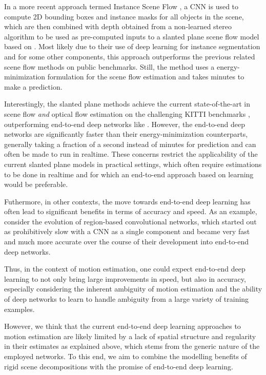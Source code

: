 In a more recent approach termed Instance Scene Flow \cite{InstanceSceneFlow},
a CNN is used to compute 2D bounding boxes and instance masks for all objects in the scene, which are then combined
with depth obtained from a non-learned stereo algorithm to be used as pre-computed
inputs to a slanted plane scene flow model based on \cite{KITTI2015}.
Most likely due to their use of deep learning for instance segmentation and for some other components, this
approach outperforms the previous related scene flow methods on public benchmarks.
Still, the method uses a energy-minimization formulation for the scene flow estimation
and takes minutes to make a prediction.

Interestingly, the slanted plane methods achieve the current state-of-the-art
in scene flow \emph{and} optical flow estimation on the challenging KITTI benchmarks \cite{KITTI2012, KITTI2015},
outperforming end-to-end deep networks like \cite{FlowNet2, SceneFlowDataset}.
However, the end-to-end deep networks are significantly faster than their energy-minimization counterparts,
generally taking a fraction of a second instead of minutes for prediction and can often be made to run in realtime.
These concerns restrict the applicability of the current slanted plane models in practical settings,
which often require estimations to be done in realtime and for which an end-to-end
approach based on learning would be preferable.

Futhermore, in other contexts, the move towards end-to-end deep learning has often lead
to significant benefits in terms of accuracy and speed.
As an example, consider the evolution of region-based convolutional networks, which started
out as prohibitively slow with a CNN as a single component and
became very fast and much more accurate over the course of their development into
end-to-end deep networks.

Thus, in the context of motion estimation, one could expect end-to-end deep learning to not only bring large improvements
in speed, but also in accuracy, especially considering the inherent ambiguity of motion estimation
and the ability of deep networks to learn to handle ambiguity from a large variety of training examples.

However, we think that the current end-to-end deep learning approaches to motion
estimation are likely limited by a lack of spatial structure and regularity in their estimates
as explained above, which stems from the generic nature of the employed networks.
To this end, we aim to combine the modelling benefits of rigid scene decompositions
with the promise of end-to-end deep learning.

